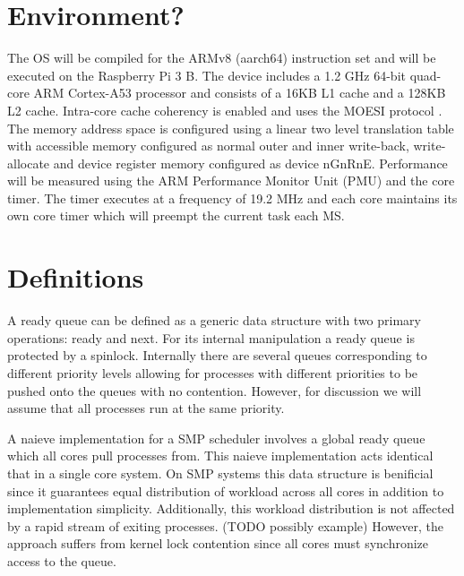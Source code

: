\documentclass[11pt, twocolumn]{proc}
\begin{document}
\section{Environment?}
\label{sec:environment?}
The OS will be compiled for the ARMv8 (aarch64) instruction set and will be executed on the Raspberry Pi 3 B.  The device includes a 1.2 GHz 64-bit quad-core ARM Cortex-A53 processor and consists of a 16KB L1 cache and a 128KB L2 cache.  Intra-core cache coherency is enabled and uses the MOESI protocol \cite{arm-dcache-coherency}.  The memory address space is configured using a linear two level translation table with accessible memory configured as normal outer and inner write-back, write-allocate and device register memory configured as device nGnRnE.  Performance will be measured using the ARM Performance Monitor Unit (PMU) and the core timer.  The timer executes at a frequency of 19.2 MHz and each core maintains its own core timer which will preempt the current task each MS. \cite{bcm2386}

\section{Definitions}
\label{sec:definitions}

A ready queue can be defined as a generic data structure with two primary operations: ready and next.  For its internal manipulation a ready queue is protected by a spinlock.  Internally there are several queues corresponding to different priority levels allowing for processes with different priorities to be pushed onto the queues with no contention.  However, for discussion we will assume that all processes run at the same priority.

A naieve implementation for a SMP scheduler involves a global ready queue which all cores pull processes from.  This naieve implementation acts identical that in a single core system.  On SMP systems this data structure is benificial since it guarantees equal distribution of workload across all cores in addition to implementation simplicity.  Additionally, this workload distribution is not affected by a rapid stream of exiting processes. (TODO possibly example)  However, the approach suffers from kernel lock contention since all cores must synchronize access to the queue.
\end{document}
